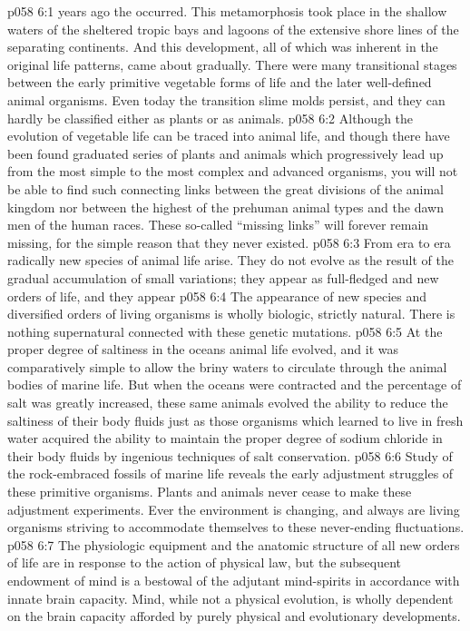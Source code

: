 \vs p058 6:1  years ago the  occurred. This metamorphosis took place in the shallow waters of the sheltered tropic bays and lagoons of the extensive shore lines of the separating continents. And this development, all of which was inherent in the original life patterns, came about gradually. There were many transitional stages between the early primitive vegetable forms of life and the later well\hyp{}defined animal organisms. Even today the transition slime molds persist, and they can hardly be classified either as plants or as animals.
\pc \vs p058 6:2 Although the evolution of vegetable life can be traced into animal life, and though there have been found graduated series of plants and animals which progressively lead up from the most simple to the most complex and advanced organisms, you will not be able to find such connecting links between the great divisions of the animal kingdom nor between the highest of the prehuman animal types and the dawn men of the human races. These so\hyp{}called “missing links” will forever remain missing, for the simple reason that they never existed.
\vs p058 6:3 From era to era radically new species of animal life arise. They do not evolve as the result of the gradual accumulation of small variations; they appear as full\hyp{}fledged and new orders of life, and they appear 
\vs p058 6:4 The  appearance of new species and diversified orders of living organisms is wholly biologic, strictly natural. There is nothing supernatural connected with these genetic mutations.
\vs p058 6:5 At the proper degree of saltiness in the oceans animal life evolved, and it was comparatively simple to allow the briny waters to circulate through the animal bodies of marine life. But when the oceans were contracted and the percentage of salt was greatly increased, these same animals evolved the ability to reduce the saltiness of their body fluids just as those organisms which learned to live in fresh water acquired the ability to maintain the proper degree of sodium chloride in their body fluids by ingenious techniques of salt conservation.\plusone
\vs p058 6:6 Study of the rock\hyp{}embraced fossils of marine life reveals the early adjustment struggles of these primitive organisms. Plants and animals never cease to make these adjustment experiments. Ever the environment is changing, and always are living organisms striving to accommodate themselves to these never\hyp{}ending fluctuations.
\vs p058 6:7 The physiologic equipment and the anatomic structure of all new orders of life are in response to the action of physical law, but the subsequent endowment of mind is a bestowal of the adjutant mind\hyp{}spirits in accordance with innate brain capacity. Mind, while not a physical evolution, is wholly dependent on the brain capacity afforded by purely physical and evolutionary developments.
